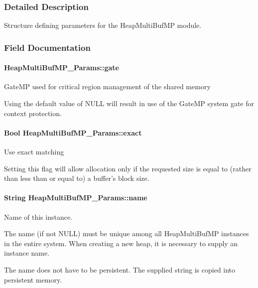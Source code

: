 \subsubsection{Detailed Description}
Structure defining parameters for the Heap\-Multi\-Buf\-M\-P module. 

\subsubsection{Field Documentation}
\paragraph[{gate}]{ Heap\-Multi\-Buf\-M\-P\-\_\-\-Params\-::gate}\label{struct_heap_multi_buf_m_p___params_a3c5f4bb4ecfb525299208a686c27cbfd}
Gate\-M\-P used for critical region management of the shared memory \begin{DoxyVerb}   Using the default value of NULL will result in use of the GateMP
   system gate for context protection.\end{DoxyVerb}
\paragraph[{exact}]{\setlength{\rightskip}{0pt plus 5cm}Bool Heap\-Multi\-Buf\-M\-P\-\_\-\-Params\-::exact}\label{struct_heap_multi_buf_m_p___params_a3ed83d3de19f3fd04062229fe6c693f7}
Use exact matching \begin{DoxyVerb}   Setting this flag will allow allocation only if the requested size
   is equal to (rather than less than or equal to) a buffer's block size.\end{DoxyVerb}
\paragraph[{name}]{\setlength{\rightskip}{0pt plus 5cm}String Heap\-Multi\-Buf\-M\-P\-\_\-\-Params\-::name}\label{struct_heap_multi_buf_m_p___params_ac7a5994ab0dd02e88d3ad16e23b1a548}
Name of this instance. \begin{DoxyVerb}   The name (if not NULL) must be unique among all HeapMultiBufMP
   instances in the entire system.  When creating a new
   heap, it is necessary to supply an instance name.

   The name does not have to be persistent.  The supplied string is copied
   into persistent memory.\end{DoxyVerb}
